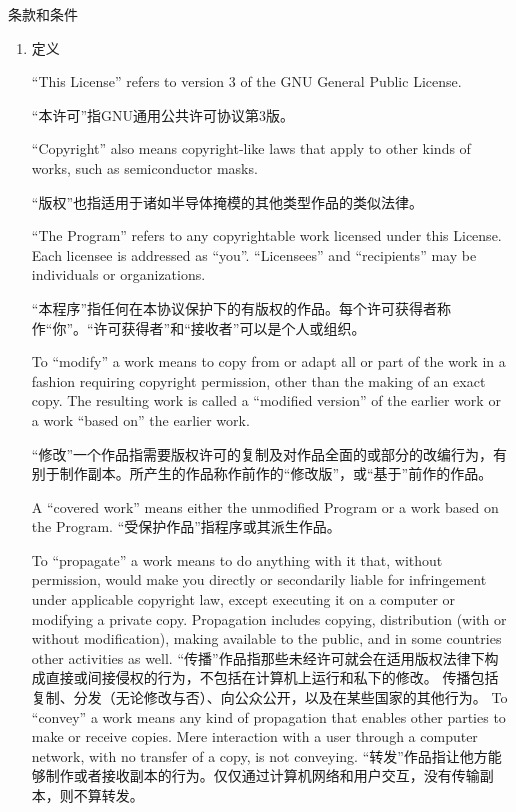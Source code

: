 \documentclass[11pt]{article}
\begin{document}
\begin{center}
{\Large \sc 条款和条件}
\end{center}


\begin{enumerate}

\addtocounter{enumi}{-1}

\item 定义

``This License'' refers to version 3 of the GNU General Public License.

“本许可”指GNU通用公共许可协议第3版。

``Copyright'' also means copyright-like laws that apply to other kinds of
works, such as semiconductor masks.

“版权”也指适用于诸如半导体掩模的其他类型作品的类似法律。

``The Program'' refers to any copyrightable work licensed under this
License.  Each licensee is addressed as ``you''.  ``Licensees'' and
``recipients'' may be individuals or organizations.

“本程序”指任何在本协议保护下的有版权的作品。每个许可获得者称作“你”。“许可获得者”和“接收者”可以是个人或组织。

To ``modify'' a work means to copy from or adapt all or part of the work
in a fashion requiring copyright permission, other than the making of an
exact copy.  The resulting work is called a ``modified version'' of the
earlier work or a work ``based on'' the earlier work.

“修改”一个作品指需要版权许可的复制及对作品全面的或部分的改编行为，有别于制作副本。所产生的作品称作前作的“修改版”，或“基于”前作的作品。

A ``covered work'' means either the unmodified Program or a work based
on the Program.
“受保护作品”指程序或其派生作品。

To ``propagate'' a work means to do anything with it that, without
permission, would make you directly or secondarily liable for
infringement under applicable copyright law, except executing it on a
computer or modifying a private copy.  Propagation includes copying,
distribution (with or without modification), making available to the
public, and in some countries other activities as well.
“传播”作品指那些未经许可就会在适用版权法律下构成直接或间接侵权的行为，不包括在计算机上运行和私下的修改。
传播包括复制、分发（无论修改与否）、向公众公开，以及在某些国家的其他行为。
To ``convey'' a work means any kind of propagation that enables other
parties to make or receive copies.  Mere interaction with a user through
a computer network, with no transfer of a copy, is not conveying.
“转发”作品指让他方能够制作或者接收副本的行为。仅仅通过计算机网络和用户交互，没有传输副本，则不算转发。


\end{enumerate}
\end{document}
